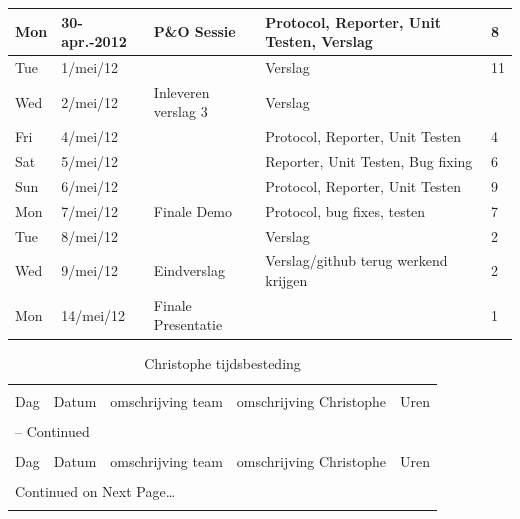 \documentclass[12pt,a4paper]{report}
\begin{document}
\begin{landscape}
\begin{longtable}{llp{7cm}p{10cm}l}
\hline
Mon & 30-apr.-2012 & P\&O Sessie & Protocol, Reporter, Unit Testen, Verslag & 8 \\ 
\hline
Tue & 1/mei/12 &  & Verslag & 11 \\ 
\hline
Wed & 2/mei/12 & Inleveren verslag 3 & Verslag &  \\ 
\hline
Fri & 4/mei/12 &  & Protocol, Reporter, Unit Testen & 4 \\ 
\hline
Sat & 5/mei/12 &  & Reporter, Unit Testen, Bug fixing & 6 \\ 
\hline
Sun & 6/mei/12 &  & Protocol, Reporter, Unit Testen & 9 \\ 
\hline
Mon & 7/mei/12 & Finale Demo & Protocol, bug fixes, testen & 7 \\ 
\hline
Tue & 8/mei/12 &  & Verslag & 2 \\ 
\hline
Wed & 9/mei/12 & Eindverslag & Verslag/github terug werkend krijgen & 2 \\ 
\hline
Mon & 14/mei/12 & Finale Presentatie &  & 1 \\ 
\hline
\end{longtable}\normalsize


\begin{longtable}{llp{7cm}p{10cm}l}
\caption{Christophe tijdsbesteding} \\

\hline \hline \\[-2ex]
  \multicolumn{1}{l}{Dag} & \multicolumn{1}{l}{Datum} &
  \multicolumn{1}{p{7cm}}{omschrijving team} &
  \multicolumn{1}{p{10cm}}{omschrijving Christophe} &
  \multicolumn{1}{l}{Uren}  \\[0.5ex] \hline \\[-1.8ex]
\endfirsthead

\multicolumn{5}{l}{{\tablename} \thetable{} -- Continued} \\[0.5ex]
\hline \hline \\[-2ex]
  \multicolumn{1}{l}{Dag} & \multicolumn{1}{l}{Datum} &
  \multicolumn{1}{p{7cm}}{omschrijving team} &
  \multicolumn{1}{p{10cm}}{omschrijving Christophe} &
  \multicolumn{1}{l}{Uren}  \\[0.5ex] \hline \\[-1.8ex]
\endhead

\multicolumn{5}{l}{{Continued on Next Page\ldots}} \\
\endfoot


\end{longtable}
\end{landscape}
\end{document}
